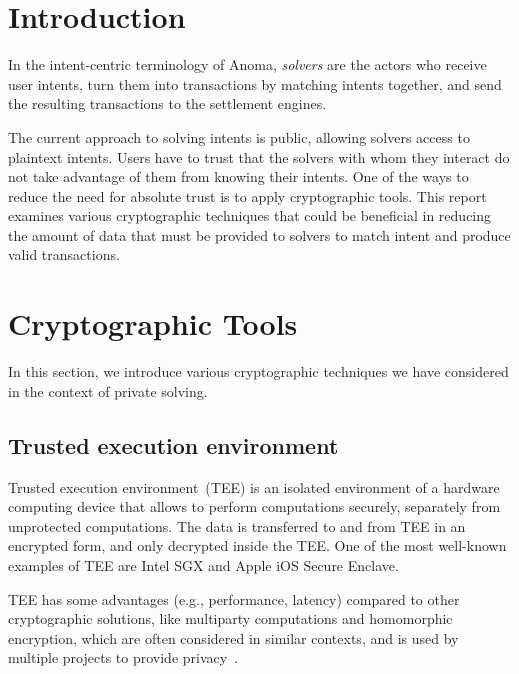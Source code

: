 \documentclass[
    9pt,            %
    report,        %
    affiltop,       %
]{art}
\begin{document}
\maketitle

\section{Introduction}\label{intro}

In the intent-centric terminology of Anoma, \emph{solvers} are the actors who receive user intents, turn them into transactions by matching intents together, and send the resulting transactions to the settlement engines. 

The current approach to solving intents is public, allowing solvers access to plaintext intents. Users have to trust that the solvers with whom they interact do not take advantage of them from knowing their intents. One of the ways to reduce the need for absolute trust is to apply cryptographic tools. This report examines various cryptographic techniques that could be beneficial in reducing the amount of data that must be provided to solvers to match intent and produce valid transactions.

\section{Cryptographic Tools}\label{tools}

In this section, we introduce various cryptographic techniques we have considered in the context of private solving. 

\subsection{Trusted execution environment}\label{TEE}

Trusted execution environment~(TEE) is an isolated environment of a
hardware computing device that allows to perform computations securely,
separately from unprotected computations. The data is transferred to and from
TEE in an encrypted form, and only decrypted inside the TEE. One of the most
well-known examples of TEE are Intel SGX and Apple iOS Secure Enclave. 

TEE has some advantages (e.g., performance, latency) compared to other cryptographic solutions, like multiparty computations and homomorphic encryption, which are often considered in similar contexts, and is used by multiple projects to provide privacy~\citep{flash,secret}.
\end{document}
